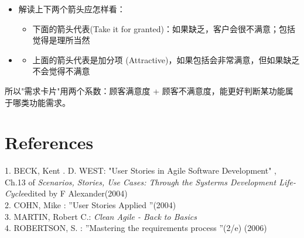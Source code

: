 \begin{itemize}
\tightlist
\item
  解读上下两个箭头应怎样看：

  \begin{itemize}
  \tightlist
  \item
    下面的箭头代表(Take it for
    granted)：如果缺乏，客户会很不满意；包括觉得是理所当然
  \end{itemize}
\end{itemize}

\begin{description}
\item[]
\end{description}

\begin{itemize}
\item
  \begin{itemize}
  \tightlist
  \item
    上面的箭头代表是加分项
    (Attractive)，如果包括会非常满意，但如果缺乏不会觉得不满意
  \end{itemize}
\end{itemize}

\begin{description}
\item[]
\end{description}

所以"需求卡片"用两个系数：顾客满意度 +
顾客不满意度，能更好判断某功能属于哪类功能需求。

\hypertarget{references}{%
\section{References}\label{references}}

1. BECK, Kent . D. WEST: "User Stories in Agile Software Development" ,
Ch.13 of \emph{Scenarios, Stories, Use Cases: Through the Systerms
Development Life-Cycle}edited by F Alexander(2004)\\
2. COHN, Mike : ''User Stories Applied ''(2004)\\
3. MARTIN, Robert C.: \emph{Clean Agile - Back to Basics}\\
4. ROBERTSON, S. : ''Mastering the requirements process ''(2/e) (2006)\\




